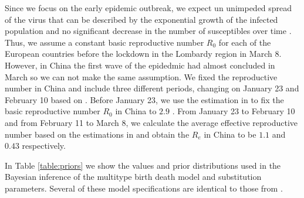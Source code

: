 Since we focus on the early epidemic outbreak, we expect un unimpeded spread of the virus that can be described by the exponential growth of the infected population and no significant decrease in the number of susceptibles over time \cite{Boskova2014}. Thus, we assume a constant basic reproductive number $R_0$ for each of the European countries before the lockdown in the Lombardy region in March 8. However, in China the first wave of the epidedmic had almost concluded in March so we can not make the same assumption. We fixed the reproductive number in China and include three different periods, changing on January 23 and February 10 based on \cite{Pan2020} \cite{Wu2020} \cite{Xiao2020}. Before January 23, we use the estimation in \cite{Park2020} \cite{Billah2020} to fix the basic reproductive number $R_0$ in China to $2.9$ . From January 23 to February 10 and from February 11 to March 8, we calculate the average effective reproductive number based on the estimations in \cite{covidre} \cite{Huisman2020} and obtain the $R_e$ in China to be $1.1$ and $0.43$ respectively.   

In Table \ref{table:priors} we show the values and prior distributions used in the Bayesian inference of the multitype birth death model and substitution parameters. Several of these model specifications are identical to those from \cite{Nadeau2020}.

